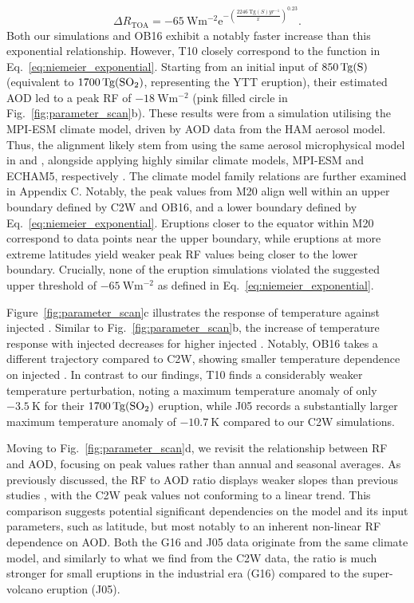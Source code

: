 \documentclass[draft]{agujournal2019}
\newcommand{\iso}[1][i]{{#1}njected \ce{SO2}}
\begin{document}
\begin{equation}
  \Delta
  R_{\mathrm{TOA}} =
  -\SI{65}{\watt\metre^{-2}}
  \mathrm{e}^{-{\left(\frac{\SI{2246}{\tera\gram(S)yr^{-1}}}{x}\right)}^{0.23}}.
  \label{eq:niemeier_exponential}
\end{equation}
%
Both our simulations and OB16 exhibit a notably faster increase than this
exponential relationship. However, T10 closely correspond to the function in
Eq.~\ref{eq:niemeier_exponential}. Starting from an initial input of
\(\SI{850}{\tera\gram(\ce{S})}\) (equivalent to \(\SI{1700}{\tera\gram(\ce{SO2})}\),
representing the YTT eruption), their estimated AOD led to a peak RF
of \(\SI{-18}{\watt\metre^{-2}}\) (pink filled circle in
Fig.~\ref{fig:parameter_scan}b). These results were from a simulation utilising the
MPI-ESM climate model, driven by AOD data from the HAM aerosol model. Thus, the
alignment likely stem from using the same aerosol microphysical model in
 and , alongside applying highly similar climate
models, MPI-ESM and ECHAM5, respectively \cite{kuma2023}. The climate model family
relations are further examined in Appendix C. Notably, the peak values from M20
align well within an upper boundary defined by C2W and OB16, and a lower
boundary defined by Eq.~\ref{eq:niemeier_exponential}. Eruptions closer to the equator
within M20 correspond to data points near the upper boundary, while eruptions at
more extreme latitudes yield weaker peak RF values being closer to the lower
boundary. Crucially, none of the eruption simulations violated the suggested upper
threshold of \(\SI{-65}{\watt\metre^{-2}}\) as defined in
Eq.~\ref{eq:niemeier_exponential}.

Figure~\ref{fig:parameter_scan}c illustrates the response of temperature against \iso{}.
Similar to Fig.~\ref{fig:parameter_scan}b, the increase of temperature response with
\iso{} decreases for higher \iso{}. Notably, OB16 takes a different trajectory
compared to C2W, showing smaller temperature dependence on \iso{}. In contrast to
our findings, T10 finds a considerably weaker temperature perturbation, noting a
maximum temperature anomaly of only \(\SI{-3.5}{\kelvin}\) for their
\(\SI{1700}{\tera\gram(\ce{SO2})}\) eruption, while J05 records a substantially
larger maximum temperature anomaly of \(\SI{-10.7}{\kelvin}\) compared to our C2W
simulations.

Moving to Fig.~\ref{fig:parameter_scan}d, we revisit the relationship between RF
and AOD, focusing on peak values rather than annual and seasonal averages. As
previously discussed, the RF to AOD ratio displays weaker slopes than
previous studies \cite{jones2005, marshall2020, timmreck2010}, with the C2W peak
values not conforming to a linear trend. This comparison suggests potential significant
dependencies on the model and its input parameters, such as latitude, but most notably
to an inherent non-linear RF dependence on AOD. Both the G16 and
J05 data originate from the same climate model, and similarly to what we find from
the C2W data, the ratio is much stronger for small eruptions in the industrial era
(G16) compared to the super-volcano eruption (J05).
\end{document}
